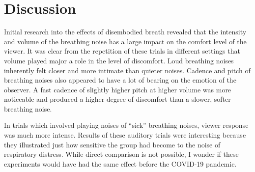 \documentclass[letterpaper]{article}
\begin{document}


\section{Discussion}

Initial research into the effects of disembodied breath revealed that the intensity and volume of the breathing noise has a large impact on the comfort level of the viewer. It was clear from the repetition of these trials in different settings that volume played major a role in the level of discomfort. Loud breathing noises inherently felt closer and more intimate than quieter noises. Cadence and pitch of breathing noises also appeared to have a lot of bearing on the emotion of the observer. A fast cadence of slightly higher pitch at higher volume was more noticeable and produced a higher degree of discomfort than a slower, softer breathing noise. 

In trials which involved playing noises of ``sick'' breathing noises, viewer response was much more intense. Results of these auditory trials were interesting because they illustrated just how sensitive the group had become to the noise of respiratory distress. While direct comparison is not possible, I wonder if these experiments would have had the same effect before the COVID-19 pandemic.  
\end{document}
